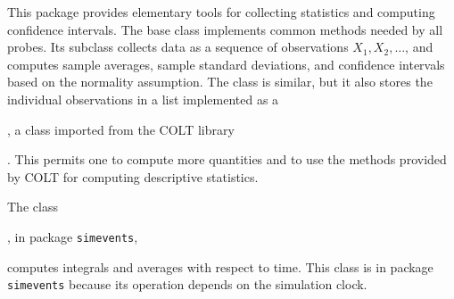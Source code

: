 
This package provides elementary tools for collecting statistics and computing
confidence intervals.  The base class
implements common methods needed by all probes.
Its subclass 
collects data as a sequence of observations $X_1,X_2,\dots$, and computes
sample averages, sample standard deviations, and confidence intervals
based on the normality assumption. 
The class  is
similar, but it also stores the individual observations in a list
implemented as a %
\begin{latexonly}, a class imported from the COLT library\end{latexonly}.
This permits one to compute more quantities and to use the methods
provided by COLT for computing descriptive statistics.

The class %
\begin{latexonly}, in package \texttt{simevents},\end{latexonly}
computes integrals and averages with respect to time.
This class is in package \texttt{simevents} because its operation depends
on the simulation clock.

\iffalse  %
The class
\externalclass{umontreal.iro.lecuyer.stat}{FunctionOfMultipleMeansTally}
collects data as a sequence of $d$-dimensional
vectors $\boldX_1, \boldX_2, \ldots$,
and computes a function of sample averages with a sample variance, and
a confidence interval on the corresponding function of means using the
delta theorem.
The function of averages to consider, as well as its gradient, need to
be computed by an implementation of
\externalclass{umontreal.iro.lecuyer.util}{MultivariateFunction},
for example,
\externalclass{umontreal.iro.lecuyer.util}{RatioFunction} for
a ratio of two quantities.
\fi  %

